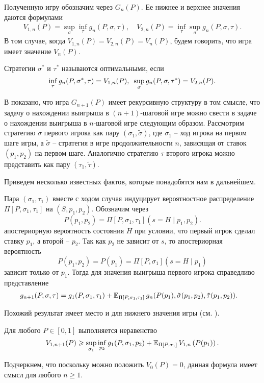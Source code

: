 Полученную игру обозначим через $G_n(P)$. Ее нижнее и верхнее значения даются
формулами
\begin{align*}
  V_{1,n}(P) = \sup_\sigma \inf_\tau g_n(P, \sigma, \tau), \quad
  V_{2,n}(P) = \inf_\tau \sup_\sigma g_n(P, \sigma, \tau).
\end{align*}
В том случае, когда $V_{1,n}(P) = V_{2,n}(P) = V_n(P)$, будем говорить, что игра
имеет значение $V_n(P)$.

Стратегии $\sigma^*$ и $\tau^*$ называются оптимальными, если
\[
  \inf_\tau g_n(P, \sigma^*, \tau) = V_{1,n}(P), \enskip \sup_\sigma g_n(P,
  \sigma, \tau^*) = V_{2,n}(P).
\]

В \cite{demeyer02} показано, что игра $G_{n+1}(P)$ имеет рекурсивную структуру в
том смысле, что задачу о нахождении выигрыша в $(n+1)$-шаговой игре можно свести
в задаче о нахождении выигрыша в $n$-шаговой игре следующим образом. Рассмотрим
стратегию $\sigma$ первого игрока как пару $(\sigma_1, \tilde{\sigma})$, где
$\sigma_1$ -- ход игрока на первом шаге игры, а $\tilde{\sigma}$ -- стратегия в
игре продолжительности $n$, зависящая от ставок $(p_1, p_2)$ на первом шаге.
Аналогично стратегию $\tau$ второго игрока можно представить как пару $(\tau_1,
\tilde{\tau})$.

Приведем несколько известных фактов, которые понадобятся нам в дальнейшем.

Пара $(\sigma_1, \tau_1)$ вместе с ходом случая индуцирует вероятностное
распределение $\Pi[P, \sigma_1, \tau_1]$ на $(S, p_1, p_2)$. Обозначим через
\[
  P(p_1, p_2) = \Pi[P, \sigma_1, \tau_1](s = H \;|\; p_1, p_2).
\]
апостериорную вероятность состояния $H$ при условии, что первый игрок сделал
ставку $p_1$, а второй -- $p_2$. Так как $p_2$ не зависит от $s$, то
апостериорная вероятность
\[
  P(p_1,p_2) = P(p_1) = \Pi[P, \sigma_1](s = H \; | \; p_1)
\]
зависит только от $p_1$. Тогда для значения выигрыша первого игрока справедливо
представление
\begin{align*}
  g_{n+1}(P, \sigma, \tau) 
  &= 
    g_1(P, \sigma_1, \tau_1) +
    \operatorname{\mathbb{E}}_{\Pi[P, \sigma_1, \tau_1]}
    g_n(P(p_1), \tilde{\sigma}(p_1, p_2), \tilde{\tau}(p_1, p_2)).
\end{align*}

Похожий результат имеет место и для нижнего значения игры (см.
\cite{demeyer02}).
\begin{lemma}
  \label{lemma:lowerBound:general}
  Для любого $P \in [0, 1]$ выполняется неравенство
  \begin{equation}
    \label{eq:fp:lowerB:nonParameterized}
    V_{1,n+1}(P) \geqslant \sup_{\sigma_1} \inf_{p_2} g_1(P, \sigma_1, p_2)
    + \operatorname{\mathbb{E}}_{\Pi[P, \sigma_1]} V_{1,n}\left( P(p_1) \right).
  \end{equation}
\end{lemma}
Подчеркнем, что поскольку можно положить $V_0(P) = 0$, данная формула имеет
смысл для любого $n \geqslant 1$.

